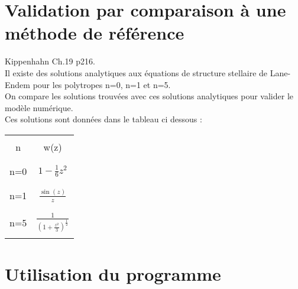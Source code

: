 \documentclass[a4paper,10pt]{article}
\begin{document}
\section{Validation par comparaison à une méthode de référence}
Kippenhahn Ch.19 p216.\\
Il existe des solutions analytiques aux équations de structure stellaire de Lane-Endem pour les polytropes n=0, n=1 et n=5.\\
On compare les solutions trouvées avec ces solutions analytiques pour valider le modèle numérique.\\
Ces solutions sont données dans le tableau ci dessous :\\
\begin{tabular}{cc}
\hline
\\
n & w(z)\\
\\
\hline
\\
n=0 & $1 - \frac{1}{6} z^2$\\
\\
\hline
\\
n=1 & $\frac{\sin(z)}{z}$\\
\\
\hline
\\
n=5 & $\frac{1}{(1+\frac{z^2}{3})^{\frac{1}{2}}}$\\
\\
\hline
\end{tabular}

\section{Utilisation du programme}
\end{document}
